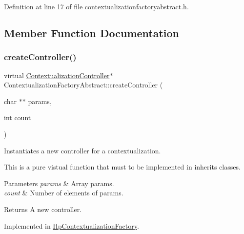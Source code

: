 Definition at line 17 of file contextualizationfactoryabstract.\+h.



\subsection{Member Function Documentation}
\mbox{\label{classContextualizationFactoryAbstract_a0898ad4d3a109c5767a1e596bf444e4a}} 
\subsubsection{\texorpdfstring{create\+Controller()}{createController()}}
{\footnotesize\ttfamily virtual \mbox{\hyperlink{classContextualizationController}{Contextualization\+Controller}}$\ast$ Contextualization\+Factory\+Abstract\+::create\+Controller (\begin{DoxyParamCaption}\item[{char $\ast$$\ast$}]{params,  }\item[{int}]{count }\end{DoxyParamCaption})\hspace{0.3cm}{\ttfamily [pure virtual]}}



Instantiates a new controller for a contextualization. 

This is a pure vistual function that must to be implemented in inherits classes. 
\begin{DoxyParams}{Parameters}
{\em params} & Array params. \\
\hline
{\em count} & Number of elements of params. \\
\hline
\end{DoxyParams}
\begin{DoxyReturn}{Returns}
A new controller. 
\end{DoxyReturn}


Implemented in \mbox{\hyperlink{classHpContextualizationFactory_ad9d9c11a2827c8854c4cadbf38b4e7ca}{Hp\+Contextualization\+Factory}}.

\mbox{\label{classContextualizationFactoryAbstract_a2d7958c0f68ad388f832abcb7777397d}} 

